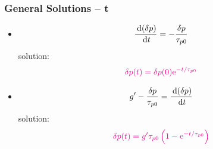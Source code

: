 \documentclass{beamer}
\begin{document}
    \begin{frame} \frametitle{General Solutions -- t}
        \begin{itemize}
            \item 
                \begin{equation*}
                    \frac{\: \mathrm{d} (\delta p)}{\: \mathrm{d} t}  = - \frac{\delta p}{\tau_{p0}} 
                \end{equation*}
                solution:
                \begin{equation*}
                    \color{magenta} \delta p(t) = \delta p(0) \mathrm{e}^{- t/ \tau_{p0}} 
                \end{equation*}
            \item 
                \begin{equation*}
                    g^\prime - \frac{\delta p}{\tau_{p0}} = \frac{\: \mathrm{d} (\delta p)}{\: \mathrm{d} t}  
                \end{equation*}
                solution:
                \begin{equation*}
                    \color{magenta} \delta p(t) = g^\prime \tau_{p0} \left( 1 - \mathrm{e}^{- t / \tau_{p0}}  \right)
                \end{equation*}
        \end{itemize}
    \end{frame}
\end{document}
